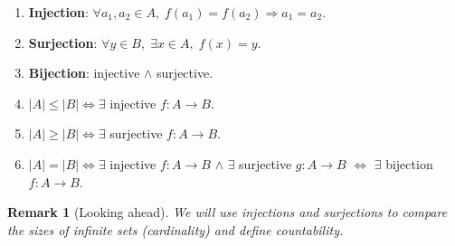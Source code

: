 \documentclass[11pt]{article}
\theoremstyle{defstyle}
\theoremstyle{thmstyle}
\theoremstyle{notstyle}
\newtheorem*{remark}{Remark}
\theoremstyle{cautionstyle}
\begin{document}
\begin{enumerate}[leftmargin=*, label=\arabic*.]
  \item \textbf{Injection}: $\forall a_1, a_2 \in A,\; f(a_1) = f(a_2) \Rightarrow a_1 = a_2$.
  \item \textbf{Surjection}: $\forall y \in B,\; \exists x \in A,\; f(x) = y$.
  \item \textbf{Bijection}: injective $\wedge$ surjective.
  \item $|A| \leq |B| \iff \exists$ injective $f: A \to B$.
  \item $|A| \geq |B| \iff \exists$ surjective $f: A \to B$.
  \item $|A| = |B| \iff \exists$ injective $f: A\to B$ $\wedge$ $\exists$ surjective $g: A \to B$ $\iff$ $\exists$ bijection $f: A \to B$.
\end{enumerate}

\begin{notebox}
\begin{remark}[Looking ahead]
We will use injections and surjections to compare the sizes of infinite sets (cardinality) and define countability.
\end{remark}
\end{notebox}
\end{document}
